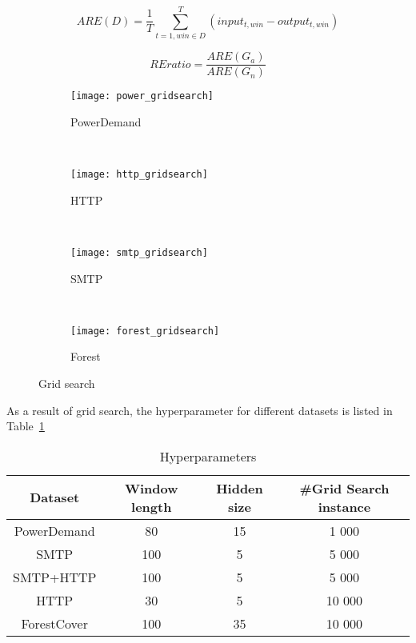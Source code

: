 \begin{equation}\label{eq:are}
ARE(D) = \frac{1}{T}\sum_{t=1,win\in D}^{T}(input_{t,win}-output_{t,win})
\end{equation}

\begin{equation}\label{eq:ratio}
REratio=\frac{ARE(G_a)}{ARE(G_n)}
\end{equation}

\begin{figure}[h]
\centering
	\begin {subfigure}[t]{0.45\textwidth}
	\centering
	\texttt{[image: power\_gridsearch]}
	\caption{PowerDemand}
	\label{fig:power}
	\end{subfigure}
	~
	\begin {subfigure}[t]{0.45\textwidth}
	\centering
	\texttt{[image: http\_gridsearch]}
	\caption{HTTP}
	\label{fig:http}
	\end{subfigure}
	~
	\begin {subfigure}[t]{0.45\textwidth}
	\centering
	\texttt{[image: smtp\_gridsearch]}
	\caption{SMTP}
	\label{fig:smtp}
	\end{subfigure}
	~
	\begin {subfigure}[t]{0.45\textwidth}
	\centering
	\texttt{[image: forest\_gridsearch]}
	\caption{Forest}
	\label{fig:forest}
	\end{subfigure}

	\caption[Grid search]{Grid search}
\label{fig:gridsearch}
\end{figure}

As a result of grid search, the hyperparameter for different datasets is listed in Table~\ref{tab:hyper}

\begin{table}[h] 
\caption{Hyperparameters} 
\centering      
\begin{tabular}{c c c c}  
\hline\hline        
Dataset & Window length & Hidden size & \#Grid Search instance \\ [0.5ex] 
\hline 
PowerDemand & 80 & 15 & 1 000 \\  
SMTP & 100 & 5 &  5 000 \\ 
SMTP+HTTP & 100 & 5 & 5 000 \\ 
HTTP & 30 & 5  &  10 000 \\ 
ForestCover & 100 & 35 & 10 000 \\ [1ex]  
\hline    
\end{tabular}
\label{tab:hyper}  
\end{table} 











